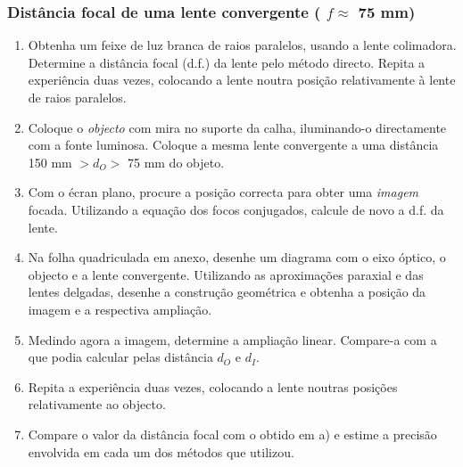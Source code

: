 \documentclass[a4paper,12pt]{article}      %
\begin{document}
\subsubsection{\sf   Distância focal de uma lente convergente ( $f  \approx$ 75 mm) }
 
\begin{enumerate}
\item Obtenha  um  feixe  de  luz  branca  de  raios  paralelos, usando a lente colimadora.
Determine  a  distância  focal (d.f.)  da  lente pelo método directo.  Repita  a  experiência  duas  vezes,  colocando  a  lente 
noutra posição relativamente à lente de raios paralelos. 
\item Coloque o \emph{objecto} com mira no suporte da calha, iluminando-o directamente com a fonte luminosa. Coloque a mesma lente convergente a uma distância 150 mm $> d_O >$ 75 mm do objeto.

\item Com o écran plano, procure a posição correcta para obter uma \emph{imagem} focada.
Utilizando a equação dos focos conjugados, calcule de novo a d.f. da lente. 
\item Na folha quadriculada em anexo, desenhe um diagrama com o eixo óptico, o objecto e a lente convergente. Utilizando as aproximações paraxial e das lentes delgadas, desenhe a construção geométrica e obtenha a posição da imagem e a respectiva ampliação.

\item Medindo agora a imagem, determine a ampliação linear. Compare-a com a que podia  calcular pelas distância $d_O$  e $d_I$. 
\item Repita a experiência duas vezes, colocando a lente noutras posições relativamente ao objecto.  
\item Compare o valor da distância focal com o obtido em a) e estime a precisão envolvida em 
cada um dos métodos que utilizou. 
\end{enumerate}

\end{document}
